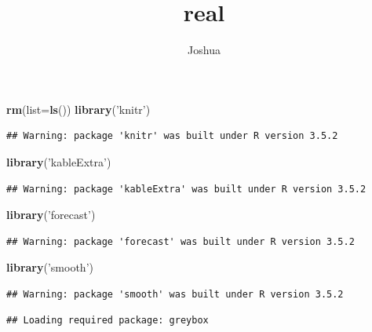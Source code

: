 \documentclass[
]{article}
\title{real}
\author{Joshua}
\date{}
\newenvironment{Shaded}{\begin{snugshade}}{\end{snugshade}}
\newcommand{\DataTypeTok}[1]{\textcolor[rgb]{0.13,0.29,0.53}{#1}}
\newcommand{\KeywordTok}[1]{\textcolor[rgb]{0.13,0.29,0.53}{\textbf{#1}}}
\newcommand{\NormalTok}[1]{#1}
\newcommand{\StringTok}[1]{\textcolor[rgb]{0.31,0.60,0.02}{#1}}
\begin{document}
\maketitle

\begin{Shaded}
\begin{Highlighting}[]
\KeywordTok{rm}\NormalTok{(}\DataTypeTok{list=}\KeywordTok{ls}\NormalTok{())}
\KeywordTok{library}\NormalTok{(}\StringTok{'knitr'}\NormalTok{)}
\end{Highlighting}
\end{Shaded}

\begin{verbatim}
## Warning: package 'knitr' was built under R version 3.5.2
\end{verbatim}

\begin{Shaded}
\begin{Highlighting}[]
\KeywordTok{library}\NormalTok{(}\StringTok{'kableExtra'}\NormalTok{)}
\end{Highlighting}
\end{Shaded}

\begin{verbatim}
## Warning: package 'kableExtra' was built under R version 3.5.2
\end{verbatim}

\begin{Shaded}
\begin{Highlighting}[]
\KeywordTok{library}\NormalTok{(}\StringTok{'forecast'}\NormalTok{)}
\end{Highlighting}
\end{Shaded}

\begin{verbatim}
## Warning: package 'forecast' was built under R version 3.5.2
\end{verbatim}

\begin{Shaded}
\begin{Highlighting}[]
\KeywordTok{library}\NormalTok{(}\StringTok{'smooth'}\NormalTok{)}
\end{Highlighting}
\end{Shaded}

\begin{verbatim}
## Warning: package 'smooth' was built under R version 3.5.2
\end{verbatim}

\begin{verbatim}
## Loading required package: greybox
\end{verbatim}
\end{document}
